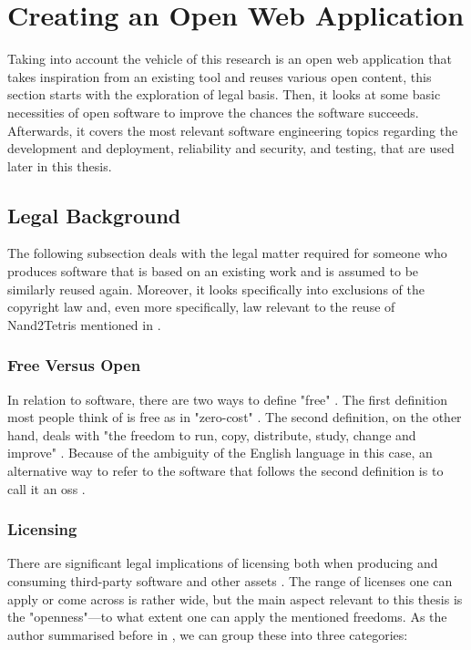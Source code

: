 \section{Creating an Open Web Application}
\label{sec:creating-application}

Taking into account the vehicle of this research is an open web application that takes inspiration from an existing tool and reuses various open content, this section starts with the exploration of legal basis.
Then, it looks at some basic necessities of open software to improve the chances the software succeeds.
Afterwards, it covers the most relevant software engineering topics regarding the development and deployment, reliability and security, and testing, that are used later in this thesis.

\subsection{Legal Background}

The following subsection deals with the legal matter required for someone who produces software that is based on an existing work and is assumed to be similarly reused again.
Moreover, it looks specifically into exclusions of the copyright law and, even more specifically, law relevant to the reuse of Nand2Tetris mentioned in .

\subsubsection{Free Versus Open}

In relation to software, there are two ways to define "free" \parencite[Chapter~1]{Fogel_2022}.
The first definition most people think of is free as in "zero-cost" \parencite[Chapter~1]{Fogel_2022}.
The second definition, on the other hand, deals with "the freedom to run, copy, distribute, study, change and improve" \parencite{FFS_2023}.
Because of the ambiguity of the English language in this case, an alternative way to refer to the software that follows the second definition is to call it an \gls{oss} \parencite{Fogel_2022}.

\subsubsection{Licensing}

There are significant legal implications of licensing both when producing and consuming third-party software and other assets \parencites[Chapter~9]{Fogel_2022}[pp. 11-12]{Duras_2020}.
The range of licenses one can apply or come across is rather wide, but the main aspect relevant to this thesis is the "openness"---to what extent one can apply the mentioned freedoms.
As the author summarised before in \textcite{Duras_2020}, we can group these into three categories:

